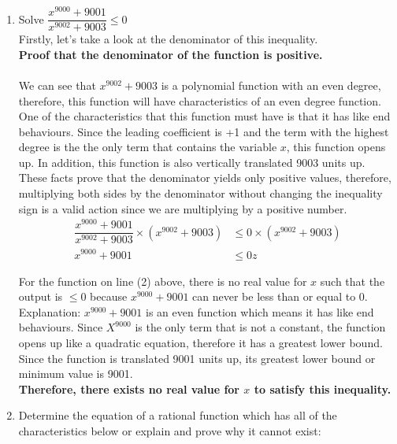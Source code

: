 \documentclass[12pt]{book}
\begin{document}
\begin{enumerate}

\item Solve $\dfrac{x^{9000}+9001}{x^{9002}+9003} \le 0$\\

Firstly, let's take a look at the denominator of this inequality.\\

\textbf{Proof that the denominator of the function is positive.}\\\\
We can see that $x^{9002}+9003$ is a polynomial function with an even degree, therefore, this function will have characteristics of an even degree function. One of the characteristics that this function must have is that it has like end behaviours. Since the leading coefficient is +1 and the term with the highest degree is the the only term that contains the variable $x$, this function opens up. In addition, this function is also vertically translated 9003 units up.\\
These facts prove that the denominator yields only positive values, therefore, multiplying both sides by the denominator without changing the inequality sign is a valid action since we are multiplying by a positive number.\\
\begingroup
\addtolength{\jot}{1em}
\begin{align}
    \dfrac{x^{9000}+9001}{x^{9002}+9003} \times (x^{9002}+9003) &\le 0 \times (x^{9002}+9003)\\
    x^{9000}+9001 &\le 0z
\end{align}
\endgroup

For the function on line (2) above, there is no real value for $x$ such that the output is $\leq 0$ because $x^{9000}+9001$ can never be less than or equal to 0.\\

Explanation: $x^{9000}+9001$ is an even function which means it has like end behaviours. Since $X^{9000}$ is the only term that is not a constant, the function opens up like a quadratic equation, therefore it has a greatest lower bound. Since the function is translated 9001 units up, its greatest lower bound or minimum value is 9001.\\

\textbf{Therefore, there exists no real value for $x$ to satisfy this inequality.}

\newpage

\item Determine the equation of a rational function which has all of the characteristics below or explain and prove why it cannot exist: 


\end{enumerate}
\end{document}
